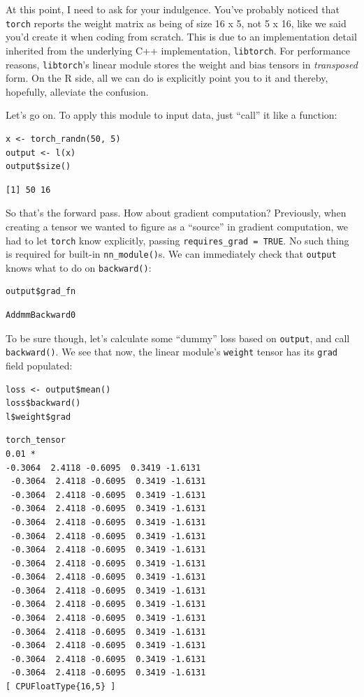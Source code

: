 \documentclass[
  letterpaper,
]{krantz}
\begin{document}
At this point, I need to ask for your indulgence. You've probably
noticed that \texttt{torch} reports the weight matrix as being of size
16 x 5, not 5 x 16, like we said you'd create it when coding from
scratch. This is due to an implementation detail inherited from the
underlying C++ implementation, \texttt{libtorch}. For performance
reasons, \texttt{libtorch}'s linear module stores the weight and bias
tensors in \emph{transposed} form. On the R side, all we can do is
explicitly point you to it and thereby, hopefully, alleviate the
confusion.

Let's go on. To apply this module to input data, just ``call'' it like a
function:

\begin{verbatim}
x <- torch_randn(50, 5)
output <- l(x)
output$size()
\end{verbatim}

\begin{verbatim}
[1] 50 16
\end{verbatim}

So that's the forward pass. How about gradient computation? Previously,
when creating a tensor we wanted to figure as a ``source'' in gradient
computation, we had to let \texttt{torch} know explicitly, passing
\texttt{requires\_grad\ =\ TRUE}. No such thing is required for built-in
\texttt{nn\_module()}s. We can immediately check that \texttt{output}
knows what to do on \texttt{backward()}:

\begin{verbatim}
output$grad_fn
\end{verbatim}

\begin{verbatim}
AddmmBackward0
\end{verbatim}

To be sure though, let's calculate some ``dummy'' loss based on
\texttt{output}, and call \texttt{backward()}. We see that now, the
linear module's \texttt{weight} tensor has its \texttt{grad} field
populated:

\begin{verbatim}
loss <- output$mean()
loss$backward()
l$weight$grad
\end{verbatim}

\begin{verbatim}
torch_tensor
0.01 *
-0.3064  2.4118 -0.6095  0.3419 -1.6131
 -0.3064  2.4118 -0.6095  0.3419 -1.6131
 -0.3064  2.4118 -0.6095  0.3419 -1.6131
 -0.3064  2.4118 -0.6095  0.3419 -1.6131
 -0.3064  2.4118 -0.6095  0.3419 -1.6131
 -0.3064  2.4118 -0.6095  0.3419 -1.6131
 -0.3064  2.4118 -0.6095  0.3419 -1.6131
 -0.3064  2.4118 -0.6095  0.3419 -1.6131
 -0.3064  2.4118 -0.6095  0.3419 -1.6131
 -0.3064  2.4118 -0.6095  0.3419 -1.6131
 -0.3064  2.4118 -0.6095  0.3419 -1.6131
 -0.3064  2.4118 -0.6095  0.3419 -1.6131
 -0.3064  2.4118 -0.6095  0.3419 -1.6131
 -0.3064  2.4118 -0.6095  0.3419 -1.6131
 -0.3064  2.4118 -0.6095  0.3419 -1.6131
 -0.3064  2.4118 -0.6095  0.3419 -1.6131
[ CPUFloatType{16,5} ]
\end{verbatim}
\end{document}
